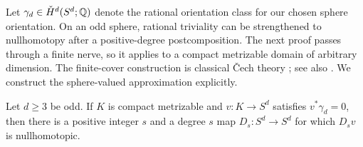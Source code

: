 Let $\gamma_d\in\check H^d(S^d;\mathbb Q)$ denote the rational orientation
class for our chosen sphere orientation.  On an odd sphere, rational
triviality can be strengthened to nullhomotopy after a positive-degree
postcomposition.  The next proof passes through a finite nerve, so
it applies to a compact metrizable domain of arbitrary dimension.
The finite-cover construction is classical \v Cech theory
\cite[Chapter~IX]{EilenbergSteenrod1952}; see also
\cite[\S2 and \S4.3]{BergfalkLupiniPanagiotopoulos2024}.
We construct the sphere-valued approximation explicitly.

\begin{lemma}
\label{lem:odd-sphere-null}
Let $d\geq3$ be odd.  If $K$ is compact metrizable and $v:K\to S^d$ satisfies
$v^*\gamma_d=0$, then there is a positive integer $s$ and a degree
$s$ map $D_s:S^d\to S^d$ for which $D_sv$ is nullhomotopic.
\end{lemma}

